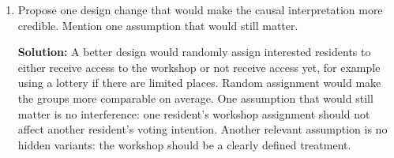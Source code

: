 \documentclass[11pt]{exam}
\begin{document}
\begin{questions}
\begin{enumerate}[leftmargin = 0.5cm, label = (\alph*), rightmargin = 0.2cm]
    \item Propose one design change that would make the causal interpretation more credible. Mention one assumption that would still matter.

    \begin{solutionorbox}[6cm]
    \textbf{Solution:} A better design would randomly assign interested residents to either receive access to the workshop or not receive access yet, for example using a lottery if there are limited places. Random assignment would make the groups more comparable on average. One assumption that would still matter is no interference: one resident's workshop assignment should not affect another resident's voting intention. Another relevant assumption is no hidden variants: the workshop should be a clearly defined treatment.
    \end{solutionorbox}
\end{enumerate}

\end{questions}
\end{document}
